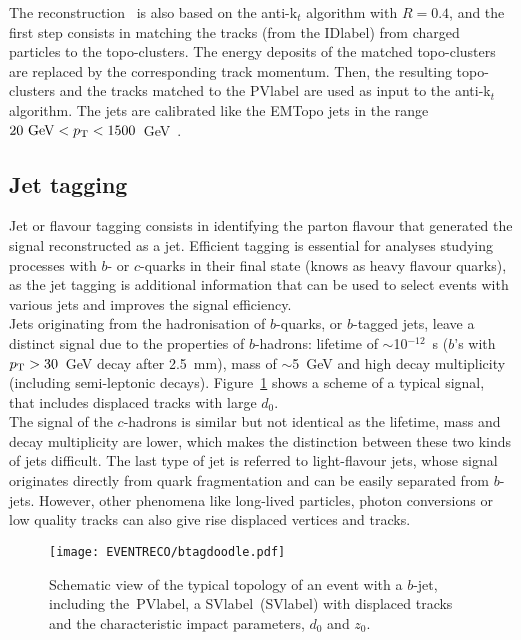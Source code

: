 The reconstruction~\cite{pflow} is also based on the anti-k$_t$ algorithm with $R=0.4$, and the first step consists in matching the tracks (from the \acrshort{IDlabel}) from charged particles to the topo-clusters. The energy deposits of the matched topo-clusters are replaced by the corresponding track momentum. Then, the resulting topo-clusters and the tracks matched to the \acrshort{PVlabel} are used as input to the anti-k$_t$ algorithm. The jets are calibrated like the EMTopo jets in the range $20\text{ GeV}<p_{\text{T}}<1500$~GeV~\cite{ATLAS_Collaboration2020-ip}. 

\subsection{Jet tagging}

Jet or flavour tagging consists in identifying the parton flavour that generated the signal reconstructed as a jet. Efficient tagging is essential for analyses studying processes with $b$- or $c$-quarks in their final state (knows as heavy flavour quarks), as the jet tagging is additional information that can be used to select events with various jets and improves the signal efficiency.\\

Jets originating from the hadronisation of $b$-quarks, or $b$-tagged jets, leave a distinct signal due to the properties of $b$-hadrons: lifetime of $\sim$10$^{-12}$~s ($b$'s with $p_{\text{T}}>30$~GeV decay after 2.5~mm), mass of $\sim$5~GeV and high decay multiplicity (including semi-leptonic decays). Figure~\ref{figEVNTRECO:BTAGTOPO} shows a scheme of a typical signal, that includes displaced tracks with large $d_0$.\\

The signal of the $c$-hadrons is similar but not identical as the lifetime, mass and decay multiplicity are lower, which makes the distinction between these two kinds of jets difficult. The last type of jet is referred to light-flavour jets, whose signal originates directly from quark fragmentation and can be easily separated from $b$-jets. However, other phenomena like long-lived particles, photon conversions or low quality tracks can also give rise displaced vertices and tracks.

\begin{figure}[htbp]
    \RawFloats
    \begin{center}
    \texttt{[image: EVENTRECO/btagdoodle.pdf]}
    \caption{
        Schematic view of the typical topology of an event with a $b$-jet, including the~\acrshort{PVlabel}, a \acrlong{SVlabel}~(\acrshort{SVlabel}) with displaced tracks and the characteristic impact parameters, $d_0$ and $z_0$.
    }
    \label{figEVNTRECO:BTAGTOPO}
    \end{center}
\end{figure}

